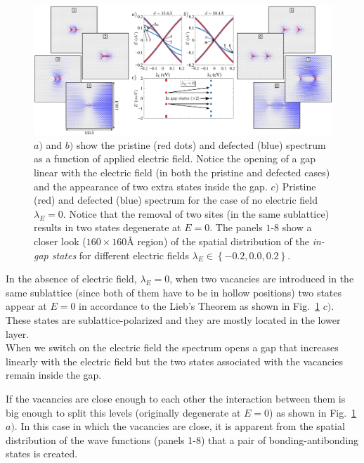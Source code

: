 \begin{figure}[h!]
\centering
\includegraphics[width=\textwidth]{chapter06/figures/double_vac_spectrum.pdf}
\vspace{-5pt}
\caption{$a)$ and $b)$ show the pristine (red dots) and defected (blue) spectrum as a function of applied electric field. Notice the opening of a gap linear with the electric field (in both the pristine and defected cases) and the appearance of two extra states inside the gap. $c)$ Pristine (red) and defected (blue) spectrum for the case of no electric field $\lambda_E=0$. Notice that the removal of two sites (in the same sublattice) results in two states degenerate at $E=0$. The panels $1$-$8$ show a closer look ($160\times160\text{\AA}$ region) of the spatial distribution of the \emph{in-gap states} for different electric fields $\lambda_E\in\left\{-0.2,0.0,0.2\right\}$.}
\label{2vac_spec}
\end{figure}
\FloatBarrier

In the absence of electric field, $\lambda_E = 0$, when two vacancies are introduced in the same sublattice (since both of them have to be in hollow positions) two states appear at $E=0$ in accordance to the Lieb's Theorem as shown in Fig.~\ref{2vac_spec} $c)$. These states are sublattice-polarized and they are mostly located in the lower layer.\\

When we switch on the electric field the spectrum opens a gap that increases linearly with the electric field but the two states associated with the vacancies remain inside the gap.

If the vacancies are close enough to each other the interaction between them is big enough to split this levels (originally degenerate at $E=0$) as shown in Fig.~\ref{2vac_spec} $a)$. In this case in which the vacancies are close, it is apparent from the spatial distribution of the wave functions (panels 1-8) that a pair of bonding-antibonding states is created.

